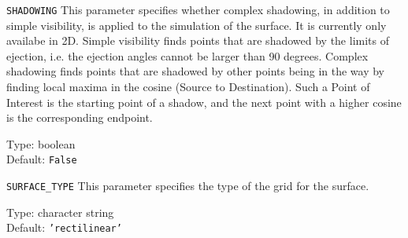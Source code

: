 \begin{keydescription}{\texttt{SHADOWING}}
This parameter specifies whether complex shadowing, in addition to simple 
visibility, is applied to the simulation of the surface. It is currently only
availabe in 2D.
\newline
Simple visibility finds points that are shadowed by the limits of ejection, i.e.
the ejection angles cannot be larger than 90 degrees.
\newline
Complex shadowing finds points that are shadowed by other points being in the way
by finding local maxima in the cosine (Source to Destination). Such a Point of
Interest is the starting point of a shadow, and the next point with a higher cosine
is the corresponding endpoint.
\begin{keytab}
   Type:    \> boolean \\
   Default: \> \texttt{False}
\end{keytab}
\end{keydescription}

\begin{keydescription}{\texttt{SURFACE\_TYPE}}
This parameter specifies the type of the grid for the surface. 
\begin{keytab}
   Type:    \> character string \\
   Default: \> \texttt{'rectilinear'}
\end{keytab}
\end{keydescription}
